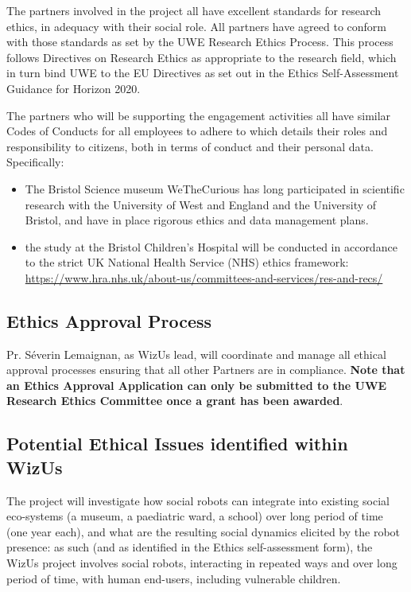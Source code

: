 \documentclass[11pt,a4paper]{report}
\newcommand{\project}{WizUs\xspace}
\begin{document}
The partners involved in the project all have excellent standards for research
ethics, in adequacy with their social role.  All partners have agreed to conform
with those standards as set by the UWE Research Ethics Process.  This process
follows Directives on Research Ethics as appropriate to the research field,
which in turn bind UWE to the EU Directives as set out in the Ethics
Self-Assessment Guidance for Horizon 2020.

The partners who will be supporting the engagement activities all have similar
Codes of Conducts for all employees to adhere to which details their roles and
responsibility to citizens, both in terms of conduct and their personal data.
Specifically:

\begin{itemize}
    \item The Bristol Science museum WeTheCurious has long participated in
        scientific research with the University of West and England and the
        University of Bristol, and have in place rigorous ethics and data
        management plans.
    \item the study at the Bristol Children's Hospital will be conducted in
        accordance to the strict UK National Health Service (NHS) ethics
        framework:
        \url{https://www.hra.nhs.uk/about-us/committees-and-services/res-and-recs/}
\end{itemize}



\subsection{Ethics Approval Process}

Pr. Séverin Lemaignan, as \project lead, will coordinate and manage all ethical
approval processes ensuring that all other Partners are in compliance. \textbf{Note that
an Ethics Approval Application can only be submitted to the UWE Research Ethics
Committee once a grant has been awarded}.

\subsection{Potential Ethical Issues identified within \project}

The project will investigate how social robots can integrate into existing
social eco-systems (a museum, a paediatric ward, a school) over long period of
time (one year each), and what are the resulting social dynamics elicited by the
robot presence: as such (and as identified in the Ethics self-assessment form),
the \project project involves social robots, interacting in repeated ways and
over long period of time, with human end-users, including vulnerable children.
\end{document}
